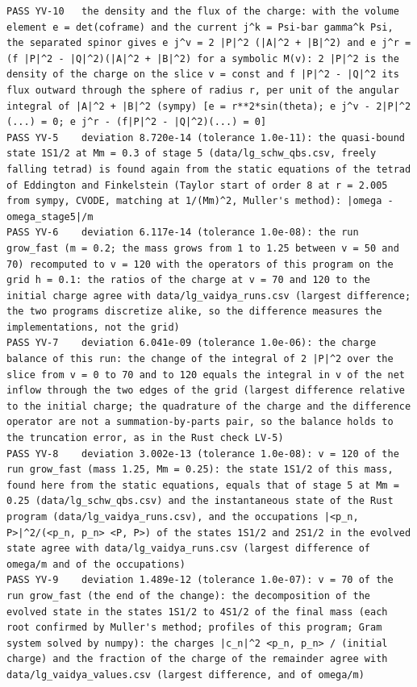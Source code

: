 \documentclass[
  10pt,
]{article}
\begin{document}
\begin{verbatim}
PASS YV-10   the density and the flux of the charge: with the volume element e = det(coframe) and the current j^k = Psi-bar gamma^k Psi, the separated spinor gives e j^v = 2 |P|^2 (|A|^2 + |B|^2) and e j^r = (f |P|^2 - |Q|^2)(|A|^2 + |B|^2) for a symbolic M(v): 2 |P|^2 is the density of the charge on the slice v = const and f |P|^2 - |Q|^2 its flux outward through the sphere of radius r, per unit of the angular integral of |A|^2 + |B|^2 (sympy) [e = r**2*sin(theta); e j^v - 2|P|^2 (...) = 0; e j^r - (f|P|^2 - |Q|^2)(...) = 0]
PASS YV-5    deviation 8.720e-14 (tolerance 1.0e-11): the quasi-bound state 1S1/2 at Mm = 0.3 of stage 5 (data/lg_schw_qbs.csv, freely falling tetrad) is found again from the static equations of the tetrad of Eddington and Finkelstein (Taylor start of order 8 at r = 2.005 from sympy, CVODE, matching at 1/(Mm)^2, Muller's method): |omega - omega_stage5|/m
PASS YV-6    deviation 6.117e-14 (tolerance 1.0e-08): the run grow_fast (m = 0.2; the mass grows from 1 to 1.25 between v = 50 and 70) recomputed to v = 120 with the operators of this program on the grid h = 0.1: the ratios of the charge at v = 70 and 120 to the initial charge agree with data/lg_vaidya_runs.csv (largest difference; the two programs discretize alike, so the difference measures the implementations, not the grid)
PASS YV-7    deviation 6.041e-09 (tolerance 1.0e-06): the charge balance of this run: the change of the integral of 2 |P|^2 over the slice from v = 0 to 70 and to 120 equals the integral in v of the net inflow through the two edges of the grid (largest difference relative to the initial charge; the quadrature of the charge and the difference operator are not a summation-by-parts pair, so the balance holds to the truncation error, as in the Rust check LV-5)
PASS YV-8    deviation 3.002e-13 (tolerance 1.0e-08): v = 120 of the run grow_fast (mass 1.25, Mm = 0.25): the state 1S1/2 of this mass, found here from the static equations, equals that of stage 5 at Mm = 0.25 (data/lg_schw_qbs.csv) and the instantaneous state of the Rust program (data/lg_vaidya_runs.csv), and the occupations |<p_n, P>|^2/(<p_n, p_n> <P, P>) of the states 1S1/2 and 2S1/2 in the evolved state agree with data/lg_vaidya_runs.csv (largest difference of omega/m and of the occupations)
PASS YV-9    deviation 1.489e-12 (tolerance 1.0e-07): v = 70 of the run grow_fast (the end of the change): the decomposition of the evolved state in the states 1S1/2 to 4S1/2 of the final mass (each root confirmed by Muller's method; profiles of this program; Gram system solved by numpy): the charges |c_n|^2 <p_n, p_n> / (initial charge) and the fraction of the charge of the remainder agree with data/lg_vaidya_values.csv (largest difference, and of omega/m)


\end{verbatim}
\end{document}
